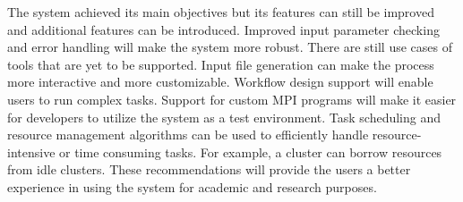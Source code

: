 \documentclass[journal]{./IEEE/IEEEtran}
\begin{document}
The system achieved its main objectives but its features can still be improved and additional features can be introduced. Improved input parameter checking and error handling will make the system more robust. There are still use cases of tools that are yet to be supported. Input file generation can make the process more interactive and more customizable.  Workflow design support will enable users to run complex tasks. Support for custom MPI programs will make it easier for developers to utilize the system as a test environment. Task scheduling and resource management algorithms can be used to efficiently handle resource-intensive or time consuming tasks. For example, a cluster can borrow resources from idle clusters. These recommendations will provide the users a better experience in using the system for academic and research purposes. 







\end{document}
